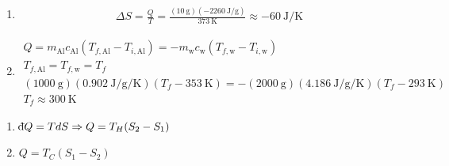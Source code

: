 \documentclass[a4paper,12pt]{article}
\def\dbar{{\mathchar'26\mkern-12mu \mathrm{d}}}
\begin{document}
\begin{enumerate}[label=\textbf{[\arabic*]}]
\begin{enumerate}
            \item
                \begin{align*}
                    \Delta S = \frac{Q}{T} = \frac{(\SI{10}{\g}) (\SI{-2260}{\J\per\g})}{\SI{373}{\K}} \approx \SI{-60}{\J\per\K}
                \end{align*}

            \item
                \begin{gather*}
                    Q = m_{\text{Al}} c_{\text{Al}} (T_{f, \text{Al}} - T_{i, \text{Al}}) = -m_\text{w} c_\text{w} (T_{f, \text{w}} - T_{i, \text{w}}) \\
                    T_{f, \text{Al}} = T_{f, \text{w}} = T_f \\
                    (\SI{1000}{\g}) (\SI{0.902}{\J\per\g\per\K}) (T_f - \SI{353}{\K}) = -(\SI{2000}{\g})(\SI{4.186}{\J\per\g\per\K}) (T_f - \SI{293}{\K}) \\
                    T_f \approx \SI{300}{\K}
                \end{gather*}
        \end{enumerate}

    \item
        \begin{enumerate}
            \item
                $\dbar Q = TdS \Rightarrow Q = T_H(S_2 - S_1)$

            \item
                $Q = T_C(S_1 - S_2)$
        \end{enumerate}

\end{enumerate}
\end{document}
